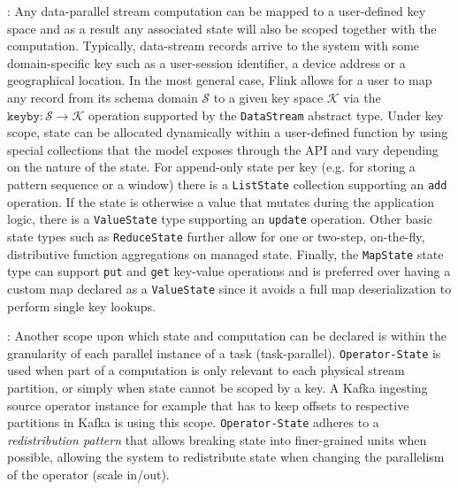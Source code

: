 : Any data-parallel stream computation can be mapped to a user-defined key space and as a result any associated state will also be scoped together with the computation. Typically, data-stream records arrive to the system with some domain-specific key such as a user-session identifier, a device address or a geographical location. In the most general case, Flink allows for a user to map any record from its schema domain $\mathcal{S}$ to a given key space $\mathcal{K}$ via the $\texttt{keyby}: \mathcal{S} \rightarrow \mathcal{K}$ operation supported by the \texttt{DataStream} abstract type. Under key scope, state can be allocated dynamically within a user-defined function by using special collections that the model exposes through the API and vary depending on the nature of the state. For append-only state per key (e.g. for storing a pattern sequence or a window) there is a \texttt{ListState} collection supporting an \texttt{add} operation. If  the state is otherwise a value that mutates during the application logic, there is a \texttt{ValueState} type supporting an \texttt{update} operation. Other basic state types such as \texttt{ReduceState} further allow for one or two-step, on-the-fly, distributive function aggregations on managed state. Finally, the \texttt{MapState} state type can support \texttt{put} and \texttt{get} key-value operations and is preferred over having a custom map declared as a \texttt{ValueState} since it avoids a full map deserialization to perform single key lookups.

: Another scope upon which state and computation can be declared is within the granularity of each parallel instance of a task (task-parallel). \texttt{Operator-State} is used when part of a computation is only relevant to each physical stream partition, or simply when state cannot be scoped by a key. A Kafka ingesting source operator instance for example that has to keep offsets to respective partitions in Kafka \cite{kreps2011kafka} is using this scope. \texttt{Operator-State} adheres to a \emph{redistribution pattern} that allows breaking state into finer-grained units when possible, allowing the system to redistribute state when changing the parallelism of the operator (scale in/out).



